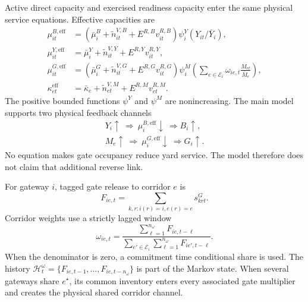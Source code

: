 \documentclass[a4paper,fleqn]{cas-sc}
\begin{document}
Active direct capacity and exercised readiness capacity enter the same physical
service equations. Effective capacities are
\begin{subequations}\label{eq:effective-capacities}
\begin{align}
 \mu^{B,\mathrm{eff}}_{it}
 &=
 \left(
 \bar\mu_i^B+\widetilde n^{V,B}_{it}
 +E^{R,B}v^{R,B}_{it}
 \right)
 \psi_i^Y(Y_{it}/\bar Y_i),\\
 \mu^{Y,\mathrm{eff}}_{it}
 &=
 \bar\mu_i^Y+\widetilde n^{V,Y}_{it}
 +E^{R,Y}v^{R,Y}_{it},\\
 \mu^{G,\mathrm{eff}}_{it}
 &=
 \left(
 \bar\mu_i^G+\widetilde n^{V,G}_{it}
 +E^{R,G}v^{R,G}_{it}
 \right)
 \psi_i^M\!\left(
 \sum_{e\in\mathcal E_i}
 \omega_{ie,t}\frac{M_{et}}{\bar M_e}
 \right),\\
 \kappa^{\mathrm{eff}}_{et}
 &=
 \bar\kappa_e+\widetilde n^{V,M}_{et}
 +E^{R,M}v^{R,M}_{et}.
\end{align}
\end{subequations}
The positive bounded functions $\psi^Y$ and $\psi^M$ are nonincreasing. The
main model supports two physical feedback channels
\begin{equation}
 \begin{gathered}
 Y_i\uparrow\ \Longrightarrow\
 \mu_i^{B,\mathrm{eff}}\downarrow\
 \Longrightarrow B_i\uparrow,\\
 M_e\uparrow\ \Longrightarrow\
 \mu_i^{G,\mathrm{eff}}\downarrow\
 \Longrightarrow G_i\uparrow.
 \end{gathered}
 \label{eq:feedback-chain}
\end{equation}
No equation makes gate occupancy reduce yard service. The model therefore does
not claim that additional reverse link.

For gateway $i$, tagged gate release to corridor $e$ is
\begin{equation}
 F_{ie,t}=
 \sum_{k,r:i(r)=i,e(r)=e}s^G_{krt}.
 \label{eq:corridor-release}
\end{equation}
Corridor weights use a strictly lagged window
\begin{equation}
 \omega_{ie,t}=
 \frac{\sum_{\ell=1}^{n_\omega}F_{ie,t-\ell}}
 {\sum_{e'\in\mathcal E_i}
  \sum_{\ell=1}^{n_\omega}F_{ie',t-\ell}}.
 \label{eq:lagged-corridor-weight}
\end{equation}
When the denominator is zero, a commitment time conditional share is used.
The history
$\mathcal H^\omega_t=
\{F_{ie,t-1},\ldots,F_{ie,t-n_\omega}\}$
is part of the Markov state. When several gateways share $e^\star$, its common
inventory enters every associated gate multiplier and creates the physical
shared corridor channel.
\end{document}
